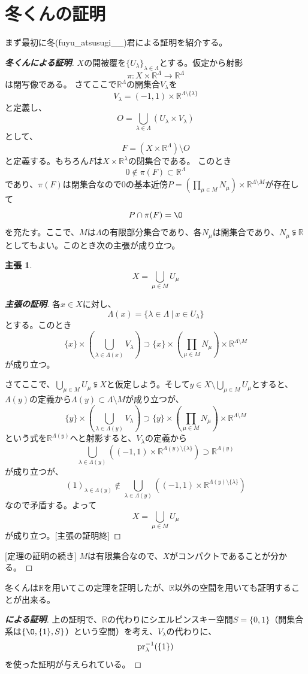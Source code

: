 \documentclass[leqno]{jsarticle}
\newtheorem*{claim}{主張}
\newcommand{\rr}{\mathbb{R}}
\newcommand{\dpst}{\displaystyle}
\newcommand{\la}{\lambda}
\newcommand{\La}{\Lambda}
\newcommand{\lil}{\la\in \La}
\begin{document}
\section{冬くんの証明}
まず最初に冬(fuyu\_atsusugi\_\_)君による証明を紹介する。
\begin{proof}[{\bf 冬くんによる証明}]
$X$の開被覆を$\{U_{\la}\}_{\lil}$とする。仮定から射影
\[
\pi:X\times \rr^{\La}\to \rr^{\La}
\]
は閉写像である。
さてここで$\rr^{\La}$の開集合$V_{\la}$を
\[
V_{\la}=(-1,1)\times \rr^{\La\setminus \{\la\}}
\]
と定義し、
\[
O=\bigcup_{\lil}(U_{\la}\times V_{\la})
\]
として、
\[
F=(X\times \rr^{\La})\setminus O
\]
と定義する。もちろん$F$は$X\times\rr^{\la} $の閉集合である。
このとき
\[
0\not\in \pi(F)\subset \rr^{\La}
\]
であり、$\pi(F)$は閉集合なので$0$の基本近傍$P=\dpst (\prod_{\mu\in M}N_{\mu})\times \rr^{\La\setminus M}$が存在して
\[
P\cap \pi(F)=\O
\]を充たす。ここで、$M$は$\La$の有限部分集合であり、各$N_{\mu}$は開集合であり、$N_{\mu}\subsetneqq\rr $としてもよい。このとき次の主張が成り立つ。
\begin{claim}
\[
X=\bigcup_{\mu\in M}U_{\mu}
\]
\end{claim}
\begin{proof}[\textbf{主張の証明}]
各$x\in X$に対し、
\[
\La(x)=\{\lil\ |\ x\in U_{\la}\}
\]
とする。このとき
\[
\{x\}\times (\bigcup_{\la \in \La(x)}V_{\la})\supset \{x\}\times (\prod_{\mu\in M}N_{\mu})\times \rr^{\La\setminus M}
\]
が成り立つ。\par
さてここで、$\dpst \bigcup_{\mu\in M}U_{\mu}\subsetneqq X$と仮定しよう。そして$y\in X\setminus \bigcup_{\mu\in M}U_{\mu}$とすると、$\La(y)$の定義から$\La(y)\subset \La\setminus M$が成り立つが、
\[
\{y\}\times (\bigcup_{\la \in \La(y)}V_{\la})\supset \{y\}\times (\prod_{\mu\in M}N_{\mu})\times \rr^{\La\setminus M}
\]
という式を$\rr^{\La(y)}$へと射影すると、$V_{\la}$の定義から
\[
\bigcup_{\la\in \La(y)}((-1,1)\times \rr^{\La(y)\setminus \{\la\}})\supset \rr^{\La(y)}
\]
が成り立つが、
\[
(1)_{\la\in\La(y)}\not\in \bigcup_{\la\in \La(y)}((-1,1)\times \rr^{\La(y)\setminus \{\la\}})
\]
なので矛盾する。よって\[
X=\bigcup_{\mu\in M}U_{\mu}
\]が成り立つ。[主張の証明終]\end{proof}
[定理の証明の続き]
$M$は有限集合なので、$X$がコンパクトであることが分かる。
\end{proof}
冬くんは$\rr$を用いてこの定理を証明したが、$\rr$以外の空間を用いても証明することが出来る。

\begin{proof}[\textbf{\cite{saito}による証明}]
上の証明で、$\rr$の代わりにシエルピンスキー空間$S=\{0,1\}$（開集合系は$\{\O,\{1\},S\}$）という空間）を考え、$V_{\la}$の代わりに、
\[
\rm{pr}_{\la}^{-1}(\{1\})
\]
を使った証明が与えられている。
\end{proof}
\end{document}
